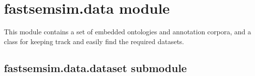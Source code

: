 \documentclass[letterpaper,10pt,english]{sphinxmanual}
\begin{document}
\section{fastsemsim.data module}
\label{fastsemsim.data:fastsemsim-data-module}\label{fastsemsim.data:module-fastsemsim.data}\label{fastsemsim.data::doc}
This module contains a set of embedded ontologies and annotation corpora, and a class for keeping track and easily find the required datasets.


\subsection{fastsemsim.data.dataset submodule}
\label{fastsemsim.data:fastsemsim-data-dataset-submodule}\label{fastsemsim.data:module-fastsemsim.data.dataset}
\end{document}
